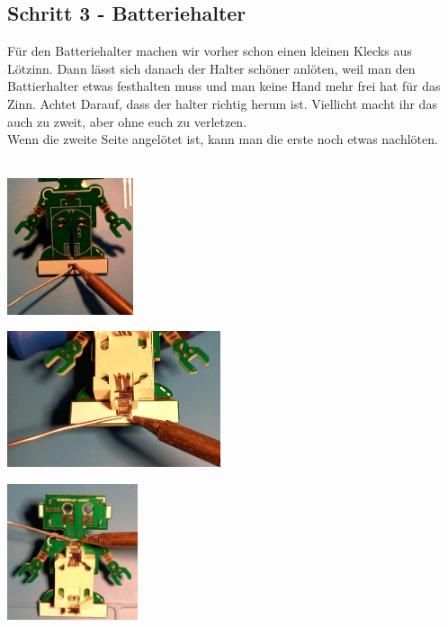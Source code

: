 \documentclass[a4paper]{article}
\begin{document}
\subsection{Schritt 3 - Batteriehalter}
Für den Batteriehalter machen wir vorher schon einen kleinen Klecks aus Lötzinn. Dann lässt sich danach der Halter schöner anlöten, weil man den Battierhalter etwas festhalten muss und man keine Hand mehr frei hat für das Zinn. Achtet Darauf, dass der halter richtig herum ist. Viellicht macht ihr das auch zu zweit, aber ohne euch zu verletzen.\\
Wenn die zweite Seite angelötet ist, kann man die erste noch etwas nachlöten.\\
\ \\
\begin{minipage}[t]{0.33\textwidth}
  \centering
  \includegraphics[height=4cm]{../pictures/Bat1.jpg}
  \label{img:Bat1}
  \end{minipage}
\begin{minipage}[t]{0.33\textwidth}
  \centering
  \includegraphics[height=4cm]{../pictures/Bat2.jpg}
  \label{img:Bat2}
\end{minipage}
\begin{minipage}[t]{0.33\textwidth}
  \centering
  \includegraphics[height=4cm]{../pictures/Bat3.jpg}
  \label{img:Bat3}
\end{minipage}
\end{document}
